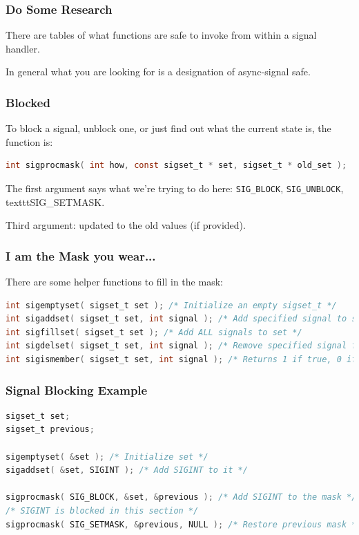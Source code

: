 \begin{frame}
\frametitle{Do Some Research}

There are tables of what functions are safe to invoke from within a signal handler. 

In general what you are looking for is a designation of \alert{async-signal safe}. 

\end{frame}


\begin{frame}[fragile]
\frametitle{Blocked}

To block a signal, unblock one, or just find out what the current state is, the function is:
\begin{lstlisting}[language=C]
int sigprocmask( int how, const sigset_t * set, sigset_t * old_set );
\end{lstlisting}

The first argument says what we're trying to do here: \texttt{SIG\_BLOCK}, \texttt{SIG\_UNBLOCK}, texttt{SIG\_SETMASK}.

Third argument: updated to the old values (if provided).

\end{frame}


\begin{frame}[fragile]
\frametitle{I am the Mask you wear...}

There are some helper functions to fill in the mask:
\begin{lstlisting}[language=C]
int sigemptyset( sigset_t set ); /* Initialize an empty sigset_t */
int sigaddset( sigset_t set, int signal ); /* Add specified signal to set */
int sigfillset( sigset_t set ); /* Add ALL signals to set */
int sigdelset( sigset_t set, int signal ); /* Remove specified signal from set */
int sigismember( sigset_t set, int signal ); /* Returns 1 if true, 0 if false */
\end{lstlisting}

\end{frame}


\begin{frame}[fragile]
\frametitle{Signal Blocking Example}

\begin{lstlisting}[language=C]
sigset_t set;
sigset_t previous;

sigemptyset( &set ); /* Initialize set */
sigaddset( &set, SIGINT ); /* Add SIGINT to it */

sigprocmask( SIG_BLOCK, &set, &previous ); /* Add SIGINT to the mask */
/* SIGINT is blocked in this section */
sigprocmask( SIG_SETMASK, &previous, NULL ); /* Restore previous mask */

\end{lstlisting}

\end{frame}



